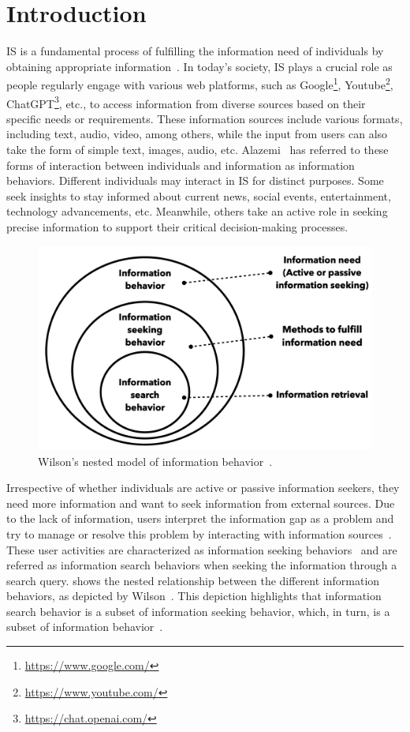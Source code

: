 
\chapter{Introduction}
 \ac{IS} is a fundamental process of fulfilling the information need of individuals by obtaining appropriate information~\cite{savolainen2016elaborating}. In today's society, \ac{IS} plays a crucial role as people regularly engage with various web platforms, such as Google\footnote{\url{https://www.google.com/}}, Youtube\footnote{\url{https://www.youtube.com/}},  ChatGPT\footnote{\url{https://chat.openai.com/}}, etc., to access information from diverse sources based on their specific needs or requirements. These information sources include various formats, including text, audio, video, among others, while the input from users can also take the form of simple text, images, audio, etc. Alazemi~\cite{Alazemi2015UsersIS} has referred to these forms of interaction between individuals and information as information behaviors. Different individuals may interact in \ac{IS} for distinct purposes. Some seek insights to stay informed about current news, social events, entertainment, technology advancements, etc. Meanwhile, others take an active role in seeking precise information to support their critical decision-making processes.

\begin{figure}[h]
	\centering
	\includegraphics[width=.6\textwidth]{images/thesis_images/information_behaviors.png}
	\caption[Nested model of information behavior.]{Wilson's nested model of information behavior~\cite{wilson1999models}. \label{fig:information_behaviors}}
\end{figure} 

Irrespective of whether individuals are active or passive information seekers, they need more information and want to seek information from external sources. Due to the lack of information, users interpret the information gap as a problem and try to manage or resolve this problem by interacting with information sources~\cite{belkin1993interaction}. These user activities are characterized as information seeking behaviors~\cite{belkin1993interaction} and are referred as information search behaviors when seeking the information through a search query.  shows the nested relationship between the different information behaviors, as depicted by Wilson~\cite{wilson1999models}. This depiction highlights that information search behavior is a subset of information seeking behavior, which, in turn, is a subset of information behavior~\cite{wilson1999models}.



